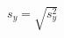 \documentclass[preview]{standalone}
\begin{document}
\begin{align*}
s_y = \sqrt{s^2_y}
\end{align*}
\end{document}
